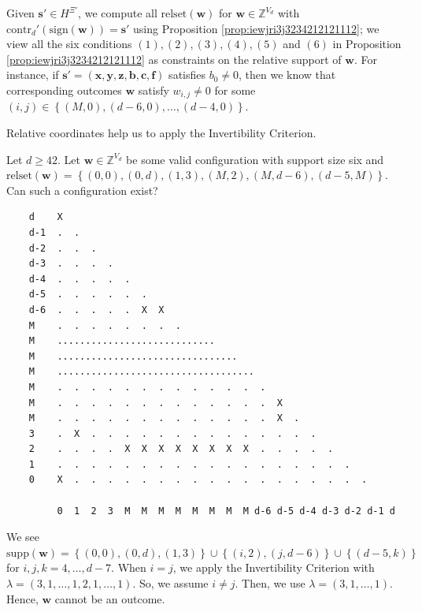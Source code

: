 \begin{remark}
    Given \( \mathbf{s}' \in {H}^{\Xi'} \), we compute all \( \mathrm{relset}(\mathbf{w}) \) for \( \mathbf{w} \in \mathbb{Z}^{V_d} \) with \( \mathrm{contr}_d'(\mathrm{sign}(\mathbf{w})) = \mathbf{s}'\) using Proposition \ref{prop:iewjri3j3234212121112}; we view all the six conditions \( (1), (2), (3), (4), (5) \) and \( (6) \) in Proposition \ref{prop:iewjri3j3234212121112} as constraints on the relative support of \( \mathbf{w} \). For instance, if \( \mathbf{s}' = (\mathbf{x},\mathbf{y},\mathbf{z},\mathbf{b},\mathbf{c},\mathbf{f} ) \) satisfies \( b_0 \neq 0 \), then we know that corresponding outcomes \( \mathbf{w} \) satisfy \( w_{i,j} \neq 0 \) for some  \( (i,j) \in \left\{ (M,0), (d-6, 0), \dots, (d-4, 0) \right\} \).
\end{remark}

Relative coordinates help us to apply the Invertibility Criterion. 

\begin{example}\label{ex:siuh438h89}
    Let \( d \geq 42 \). Let \( \mathbf{w} \in \mathbb{Z}^{V_d} \) be some valid configuration with support size six and \( \mathrm{relset}(\mathbf{w}) = \left\{ (0,0), (0,d), (1,3), (M,2), (M, d-6), (d-5, M) \right\} \). Can such a configuration exist?
    \begin{small}
    \begin{verbatim}
    d    X
    d-1  .  .
    d-2  .  .  .
    d-3  .  .  .  .
    d-4  .  .  .  .  .
    d-5  .  .  .  .  .  .
    d-6  .  .  .  .  .  X  X
    M    .  .  .  .  .  .  .  .
    M    ............................
    M    ................................
    M    ...................................
    M    .  .  .  .  .  .  .  .  .  .  .  .  . 
    M    .  .  .  .  .  .  .  .  .  .  .  .  .  X
    M    .  .  .  .  .  .  .  .  .  .  .  .  .  X  .   
    3    .  X  .  .  .  .  .  .  .  .  .  .  .  .  .  .
    2    .  .  .  .  X  X  X  X  X  X  X  X  .  .  .  .  .     
    1    .  .  .  .  .  .  .  .  .  .  .  .  .  .  .  .  .  .
    0    X  .  .  .  .  .  .  .  .  .  .  .  .  .  .  .  .  .  .

         0  1  2  3  M  M  M  M  M  M  M  M d-6 d-5 d-4 d-3 d-2 d-1 d
    \end{verbatim}
    \end{small}
    We see \( \mathrm{supp}(\mathbf{w}) = \left\{ (0,0), (0,d), (1,3) \right\} \cup \left\{ (i,2), (j,d-6 ) \right\} \cup \left\{ (d-5,k ) \right\} \)
    for \( i,j,k  = 4, \dots, d-7 \). When \( i = j \), we apply the Invertibility Criterion with \( \lambda = (3,1, \dots,1, 2, 1, \dots, 1) \). So, we assume \( i \neq j \). Then, we use \( \lambda = (3, 1, \dots, 1) \). Hence, \( \mathbf{w} \) cannot be an outcome.
\end{example}

